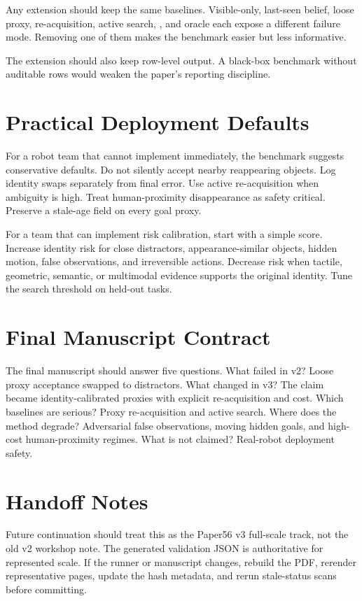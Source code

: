 Any extension should keep the same baselines. Visible-only, last-seen belief, loose proxy, re-acquisition, active search, \method, and oracle each expose a different failure mode. Removing one of them makes the benchmark easier but less informative.

The extension should also keep row-level output. A black-box benchmark without auditable rows would weaken the paper's reporting discipline.

\section{Practical Deployment Defaults}

For a robot team that cannot implement \method immediately, the benchmark suggests conservative defaults. Do not silently accept nearby reappearing objects. Log identity swaps separately from final error. Use active re-acquisition when ambiguity is high. Treat human-proximity disappearance as safety critical. Preserve a stale-age field on every goal proxy.

For a team that can implement risk calibration, start with a simple score. Increase identity risk for close distractors, appearance-similar objects, hidden motion, false observations, and irreversible actions. Decrease risk when tactile, geometric, semantic, or multimodal evidence supports the original identity. Tune the search threshold on held-out tasks.

\section{Final Manuscript Contract}

The final manuscript should answer five questions. What failed in v2? Loose proxy acceptance swapped to distractors. What changed in v3? The claim became identity-calibrated proxies with explicit re-acquisition and cost. Which baselines are serious? Proxy re-acquisition and active search. Where does the method degrade? Adversarial false observations, moving hidden goals, and high-cost human-proximity regimes. What is not claimed? Real-robot deployment safety.

\section{Handoff Notes}

Future continuation should treat this as the Paper56 v3 full-scale track, not the old v2 workshop note. The generated validation JSON is authoritative for represented scale. If the runner or manuscript changes, rebuild the PDF, rerender representative pages, update the hash metadata, and rerun stale-status scans before committing.


